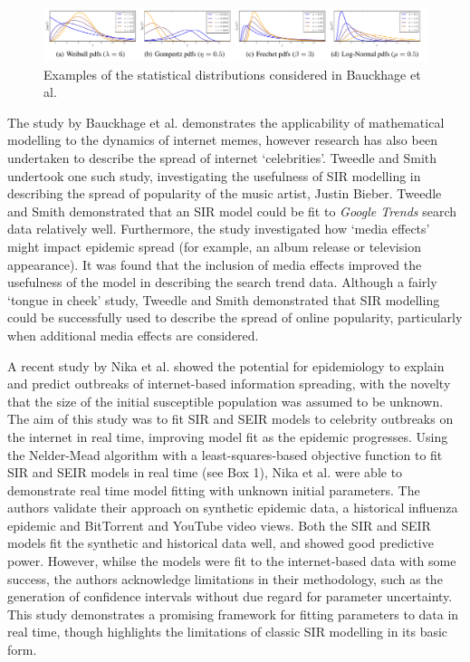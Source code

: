\documentclass[11pt, a4paper, oneside,titlepage]{article}
\begin{document}
\begin{figure}[ht!]
\centering
\includegraphics[width=160mm]{statsdist.png}
\caption{Examples of the statistical distributions considered in Bauckhage et al.\cite{meme}}
\label{sir}
\end{figure}

The study by Bauckhage et al. demonstrates the applicability of mathematical modelling to the dynamics of internet memes, however research has also been undertaken to describe the spread of internet `celebrities'. Tweedle and Smith undertook one such study, investigating the usefulness of SIR modelling in describing the spread of popularity of the music artist, Justin Bieber.\cite{bieber} Tweedle and Smith demonstrated that an SIR model could be fit to \emph{Google Trends} search data relatively well. Furthermore, the study investigated how `media effects' might impact epidemic spread (for example, an album release or television appearance). It was found that the inclusion of media effects improved the usefulness of the model in describing the search trend data. Although a fairly `tongue in cheek' study, Tweedle and Smith demonstrated that SIR modelling could be successfully used to describe the spread of online popularity, particularly when additional media effects are considered.

A recent study by Nika et al. showed the potential for epidemiology to explain and predict outbreaks of internet-based information spreading, with the novelty that the size of the initial susceptible population was assumed to be unknown.\cite{marily2013} The aim of this study was to fit SIR and SEIR models to celebrity outbreaks on the internet in real time, improving model fit as the epidemic progresses. Using the Nelder-Mead algorithm with a least-squares-based objective function to fit SIR and SEIR models in real time (see Box 1), Nika et al. were able to demonstrate real time model fitting with unknown initial parameters. The authors validate their approach on synthetic epidemic data, a historical influenza epidemic and BitTorrent and YouTube video views. Both the SIR and SEIR models fit the synthetic and historical data well, and showed good predictive power. However, whilse the models were fit to the internet-based data with some success, the authors acknowledge limitations in their methodology, such as the generation of confidence intervals without due regard for parameter uncertainty. This study demonstrates a promising framework for fitting parameters to data in real time, though highlights the limitations of classic SIR modelling in its basic form.
\end{document}
